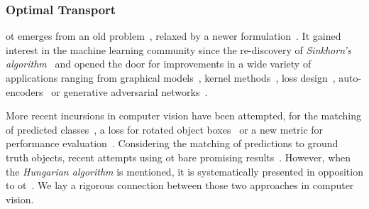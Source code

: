 \subsubsection{Optimal Transport}
\Gls{ot} emerges from an old problem~\cite{monge1781memoire}, relaxed by a newer formulation~\cite{kantorovich}. It gained interest in the machine learning community since the re-discovery of \emph{Sinkhorn's algorithm}~\cite{cuturi2013sinkhorn} and opened the door for improvements in a wide variety of applications ranging from graphical models~\cite{montavon2016wasserstein}, kernel methods~\cite{kolouri2016sliced,de2020wasserstein}, loss design~\cite{frogner2015learningwasserstein}, auto-encoders~\cite{tolstikhin2017wasserstein,kolouri2018sliced,rubenstein2018latent} or generative adversarial networks~\cite{arjovsky2017wasserstein, gulrajani2017improved}. 

More recent incursions in computer vision have been attempted, \eg for the matching of predicted classes~\cite{Han_2020_CVPR_Workshops}, a loss for rotated object boxes~\cite{pmlr-v139-yang21l} or a new metric for performance evaluation~\cite{otani2022optimal}.
Considering the matching of predictions to ground truth objects, recent attempts using \gls{ot} bare promising results~\cite{ge2021ota,ge2021yolox}. However, when the \emph{Hungarian algorithm} is mentioned, it is systematically presented in opposition to \gls{ot}~\cite{ge2021ota,vo2022review}. We lay a rigorous connection between those two approaches in computer vision. 

